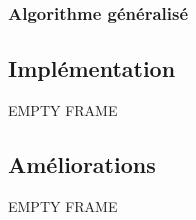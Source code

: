 \documentclass{beamer}%
\begin{document}
			\begin{frame}
				\frametitle{Algorithme généralisé}
				\begin{figure}
					\centering
					\qquad
				\end{figure}	
				\begin{figure}
					\centering
					\qquad
				\end{figure}
			\end{frame}
			
		\subsection{Implémentation}
			\begin{frame}
				EMPTY FRAME
			\end{frame}
			
		\subsection{Améliorations}
			\begin{frame}
				EMPTY FRAME
			\end{frame}
			
\end{document}
